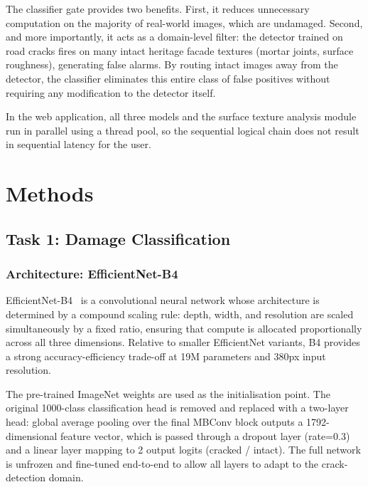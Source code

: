 \documentclass[12pt,a4paper]{article}
\begin{document}
The classifier gate provides two benefits. First, it reduces unnecessary computation on the majority of real-world images, which are undamaged. Second, and more importantly, it acts as a domain-level filter: the detector trained on road cracks fires on many intact heritage facade textures (mortar joints, surface roughness), generating false alarms. By routing intact images away from the detector, the classifier eliminates this entire class of false positives without requiring any modification to the detector itself.

In the web application, all three models and the surface texture analysis module run in parallel using a thread pool, so the sequential logical chain does not result in sequential latency for the user.

\section{Methods}

\subsection{Task 1: Damage Classification}
\label{sec:cls_methods}

\subsubsection{Architecture: EfficientNet-B4}

EfficientNet-B4~\cite{tan2019efficientnet} is a convolutional neural network whose architecture is determined by a compound scaling rule: depth, width, and resolution are scaled simultaneously by a fixed ratio, ensuring that compute is allocated proportionally across all three dimensions. Relative to smaller EfficientNet variants, B4 provides a strong accuracy-efficiency trade-off at 19M parameters and 380px input resolution.

The pre-trained ImageNet weights are used as the initialisation point. The original 1000-class classification head is removed and replaced with a two-layer head: global average pooling over the final MBConv block outputs a 1792-dimensional feature vector, which is passed through a dropout layer (rate=0.3) and a linear layer mapping to 2 output logits (cracked / intact). The full network is unfrozen and fine-tuned end-to-end to allow all layers to adapt to the crack-detection domain.
\end{document}
